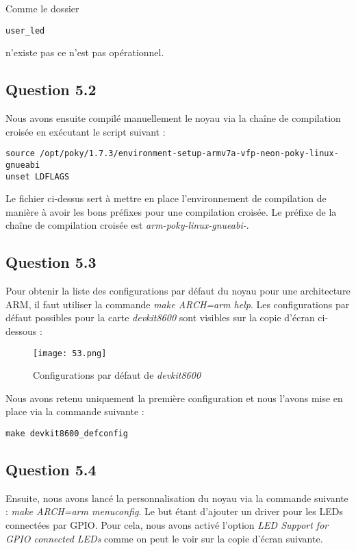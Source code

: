\documentclass[a4paper,12pt]{report}
\begin{document}
Comme le dossier 
\begin{verbatim} 
user_led 
\end{verbatim} 
n'existe pas ce n'est pas opérationnel.

\subsection{Question 5.2}

Nous avons ensuite compilé manuellement le noyau via la chaîne de compilation croisée en exécutant le script suivant :
\begin{verbatim} 
source /opt/poky/1.7.3/environment-setup-armv7a-vfp-neon-poky-linux-gnueabi
unset LDFLAGS
\end{verbatim} 

Le fichier ci-dessus sert à mettre en place l'environnement de compilation de manière à avoir les bons préfixes pour une compilation croisée.
Le préfixe de la chaîne de compilation croisée est \textit{arm-poky-linux-gnueabi-}.

\subsection{Question 5.3}

Pour obtenir la liste des configurations par défaut du noyau pour une architecture ARM, il faut utiliser la commande \textit{make ARCH=arm help}.
Les configurations par défaut possibles pour la carte \textit{devkit8600} sont visibles sur la copie d'écran ci-dessous :

\begin{figure}[h]
	\centering
		\texttt{[image: 53.png]}
		\caption{Configurations par défaut de \textit{devkit8600}}
\end{figure}

Nous avons retenu uniquement la première configuration et nous l'avons mise en place via la commande suivante : 
\begin{verbatim} 
make devkit8600_defconfig
\end{verbatim} 

\subsection{Question 5.4}

Ensuite, nous avons lancé la personnalisation du noyau via la commande suivante : \textit{make ARCH=arm menuconfig}.
Le but étant d'ajouter un driver pour les LEDs connectées par GPIO.
Pour cela, nous avons activé l'option \textit{LED Support for GPIO connected LEDs} comme on peut le voir sur la copie d'écran suivante.
\end{document}
